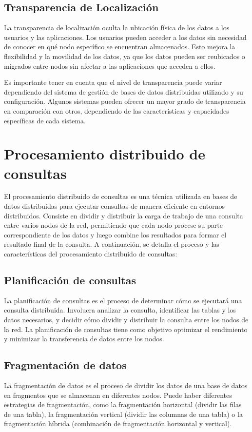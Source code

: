 \subsection{Transparencia de Localización}
\noindent
La transparencia de localización oculta la ubicación física de los datos a los usuarios y las aplicaciones. Los usuarios pueden acceder a los datos sin necesidad de conocer en qué nodo específico se encuentran almacenados. Esto mejora la flexibilidad y la movilidad de los datos, ya que los datos pueden ser reubicados o migrados entre nodos sin afectar a las aplicaciones que acceden a ellos.

Es importante tener en cuenta que el nivel de transparencia puede variar dependiendo del sistema de gestión de bases de datos distribuidas utilizado y su configuración. Algunos sistemas pueden ofrecer un mayor grado de transparencia en comparación con otros, dependiendo de las características y capacidades específicas de cada sistema.

\section{Procesamiento distribuido de consultas}
\noindent
El procesamiento distribuido de consultas es una técnica utilizada en bases de datos distribuidas para ejecutar consultas de manera eficiente en entornos distribuidos. Consiste en dividir y distribuir la carga de trabajo de una consulta entre varios nodos de la red, permitiendo que cada nodo procese su parte correspondiente de los datos y luego combine los resultados para formar el resultado final de la consulta. A continuación, se detalla el proceso y las características del procesamiento distribuido de consultas:

\subsection{Planificación de consultas}
\noindent
La planificación de consultas es el proceso de determinar cómo se ejecutará una consulta distribuida. Involucra analizar la consulta, identificar las tablas y los datos necesarios, y decidir cómo dividir y distribuir la consulta entre los nodos de la red. La planificación de consultas tiene como objetivo optimizar el rendimiento y minimizar la transferencia de datos entre los nodos.

\subsection{Fragmentación de datos}
\noindent
La fragmentación de datos es el proceso de dividir los datos de una base de datos en fragmentos que se almacenan en diferentes nodos. Puede haber diferentes estrategias de fragmentación, como la fragmentación horizontal (dividir las filas de una tabla), la fragmentación vertical (dividir las columnas de una tabla) o la fragmentación híbrida (combinación de fragmentación horizontal y vertical).

